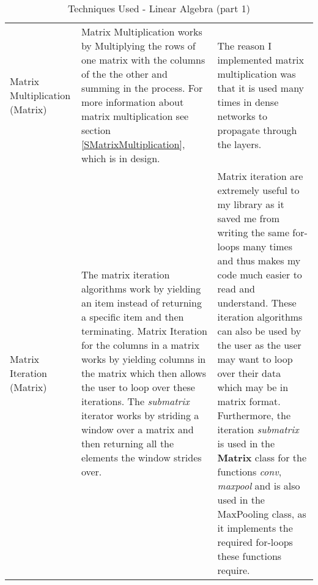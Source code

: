 \begin{table}[H]
\begin{tabular}{|p{2.2cm}|p{6cm}|p{7cm}|}
    Matrix Multiplication (Matrix) & Matrix Multiplication works by Multiplying the rows of one matrix with the columns of the the other and summing in the process. For more information about matrix multiplication see section \ref{SMatrixMultiplication}, which is in design. & The reason I implemented matrix multiplication was that it is used many times in dense networks to propagate through the layers. \\ \cline{1-3}
    
    Matrix Iteration (Matrix) & The matrix iteration algorithms work by yielding an item instead of returning a specific item and then terminating. Matrix Iteration for the columns in a matrix works by yielding columns in the matrix which then allows the user to loop over these iterations. The \textit{submatrix} iterator works by striding a window over a matrix and then returning all the elements the window strides over. & Matrix iteration are extremely useful to my library as it saved me from writing the same for-loops many times and thus makes my code much easier to read and understand. These iteration algorithms can also be used by the user as the user may want to loop over their data which may be in matrix format. Furthermore, the iteration \textit{submatrix} is used in the \textbf{Matrix} class for the functions \textit{conv}, \textit{maxpool} and is also used in the MaxPooling class, as it implements the required for-loops these functions require. \\ \cline{1-3}
    \end{tabular}
    \caption{Techniques Used - Linear Algebra (part 1)}
\end{table}


